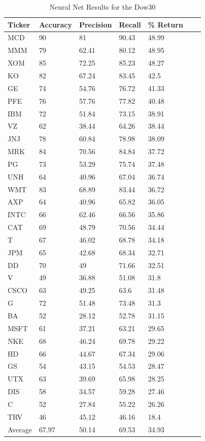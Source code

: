 \documentclass{article}
\begin{document}
\begin{table}[h]
  \begin{tabular}{@{}lllllll@{}}
    \toprule
    Ticker & Accuracy & Precision & Recall & \% Return & \\ \midrule
    MCD & 90 & 81 & 90.43 & 48.99 & \\
    MMM & 79 & 62.41 & 80.12 & 48.95 & \\
    XOM & 85 & 72.25 & 85.23 & 48.27 & \\
    KO & 82 & 67.24 & 83.45 & 42.5 & \\
    GE & 74 & 54.76 & 76.72 & 41.33 & \\
    PFE & 76 & 57.76 & 77.82 & 40.48 & \\
    IBM & 72 & 51.84 & 73.15 & 38.91 & \\
    VZ & 62 & 38.44 & 64.26 & 38.44 & \\
    JNJ & 78 & 60.84 & 78.98 & 38.09 & \\
    MRK & 84 & 70.56 & 84.84 & 37.72 & \\
    PG & 73 & 53.29 & 75.74 & 37.48 & \\
    UNH & 64 & 40.96 & 67.04 & 36.74 & \\
    WMT & 83 & 68.89 & 83.44 & 36.72 & \\
    AXP & 64 & 40.96 & 65.82 & 36.05 & \\
    INTC & 66 & 62.46 & 66.56 & 35.86 & \\
    CAT & 69 & 48.79 & 70.56 & 34.44 & \\
    T & 67 & 46.02 & 68.78 & 34.18 & \\
    JPM & 65 & 42.68 & 68.34 & 32.71 & \\
    DD & 70 & 49 & 71.66 & 32.51 & \\
    V & 49 & 36.88 & 51.08 & 31.8 & \\
    CSCO & 63 & 49.25 & 63.6 & 31.48 & \\
    G & 72 & 51.48 & 73.48 & 31.3 & \\
    BA & 52 & 28.12 & 52.78 & 31.15 & \\
    MSFT & 61 & 37.21 & 63.21 & 29.65 & \\
    NKE & 68 & 46.24 & 69.78 & 29.22 & \\
    HD & 66 & 44.67 & 67.34 & 29.06 & \\
    GS & 54 & 43.15 & 54.53 & 28.47 & \\
    UTX & 63 & 39.69 & 65.98 & 28.25 & \\
    DIS & 58 & 34.57 & 59.28 & 27.46 & \\
    C & 52 & 27.84 & 55.22 & 26.26 & \\
    TRV & 46 & 45.12 & 46.16 & 18.4 & \\ \bottomrule
    Average & 67.97 & 50.14 & 69.53 & 34.93 & \\
  \end{tabular}
  \caption{Neural Net Results for the Dow30}
  \label{my-label}
\end{table}
\end{document}
